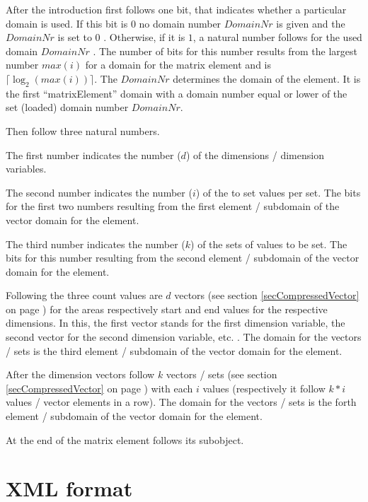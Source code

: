 After the introduction first follows one bit, that indicates whether a particular domain is used. If this bit is $0$ no domain number $DomainNr$ is given and the $DomainNr$ is set to 0 . Otherwise, if it is $1$, a natural number follows for the used domain $DomainNr$ . The number of bits for this number results from the largest number $max(i)$ for a domain for the matrix element and is $\lceil \log_2( max(i) ) \rceil$.
The $DomainNr$ determines the domain of the element. It is the first ``matrixElement'' domain with a domain number equal or lower of the set (loaded) domain number $DomainNr$.

Then follow three natural numbers.

The first number indicates the number ($d$) of the dimensions / dimension variables.

The second number indicates the number ($i$) of the to set values per set.
The bits for the first two numbers resulting from the first element / subdomain of the vector domain for the element.

The third number indicates the number ($k$) of the sets of values to be set. The bits for this number resulting from the second element / subdomain of the vector domain for the element.

Following the three count values are $d$ vectors (see section \ref{secCompressedVector} on page \pageref{secCompressedVector}) for the areas respectively start and end values for the respective dimensions. In this, the first vector stands for the first dimension variable, the second vector for the second dimension variable, etc. . The domain for the vectors / sets is the third element / subdomain of the vector domain for the element.

After the dimension vectors follow $k$ vectors / sets (see section \ref{secCompressedVector} on page \pageref{secCompressedVector}) with each $i$ values (respectively it follow $k * i$ values / vector elements in a row). The domain for the vectors / sets is the forth element / subdomain of the vector domain for the element.

At the end of the matrix element follows its subobject.



\section{XML format}
\label{xmlFormat}

